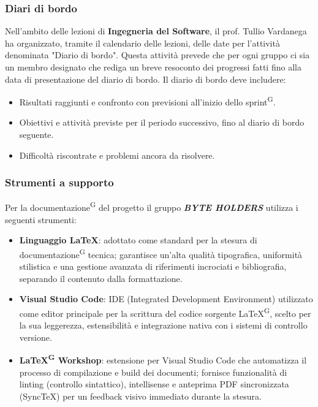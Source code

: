 \documentclass[a4paper, 11pt]{article}
\begin{document}
\subsubsection{Diari di bordo}
Nell'ambito delle lezioni di \textbf{Ingegneria del Software}, il prof. Tullio Vardanega ha organizzato, tramite il calendario delle lezioni, delle date per l'attività denominata "Diario di bordo".
Questa attività prevede che per ogni gruppo ci sia un membro designato che rediga un breve resoconto dei progressi fatti fino alla data di presentazione del diario di bordo.
Il diario di bordo deve includere:
\begin{itemize}
    \item Risultati raggiunti e confronto con previsioni all'inizio dello sprint\textsuperscript{G}.
    \item Obiettivi e attività previste per il periodo successivo, fino al diario di bordo seguente.
    \item Difficoltà riscontrate e problemi ancora da risolvere.
\end{itemize}

\subsubsection{Strumenti a supporto}

Per la documentazione\textsuperscript{G} del progetto il gruppo \textbf{\textit{BYTE HOLDERS}} utilizza i seguenti strumenti:

\begin{itemize}
    \item \textbf{Linguaggio \LaTeX}: adottato come standard per la stesura di documentazione\textsuperscript{G} tecnica; garantisce un'alta qualità tipografica, uniformità stilistica e una gestione avanzata di riferimenti incrociati e bibliografia, separando il contenuto dalla formattazione.
    \item \textbf{Visual Studio Code}: IDE (Integrated Development Environment) utilizzato come editor principale per la scrittura del codice sorgente LaTeX\textsuperscript{G}, scelto per la sua leggerezza, estensibilità e integrazione nativa con i sistemi di controllo versione.
    \item \textbf{LaTeX\textsuperscript{G} Workshop}: estensione per Visual Studio Code che automatizza il processo di compilazione e build dei documenti; fornisce funzionalità di linting (controllo sintattico), intellisense e anteprima PDF sincronizzata (SyncTeX) per un feedback visivo immediato durante la stesura.
\end{itemize}
\end{document}
